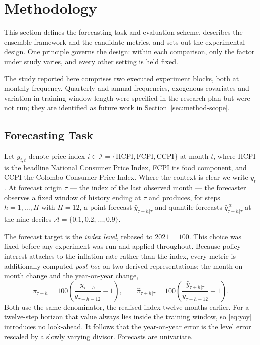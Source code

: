 \documentclass[12pt]{article}
\begin{document}
\section{Methodology}
\label{sec:methodology}

This section defines the forecasting task and evaluation scheme, describes the
ensemble framework and the candidate metrics, and sets out the experimental
design. One principle governs the design: within each comparison, only the
factor under study varies, and every other setting is held fixed.

The study reported here comprises two executed experiment blocks, both at
monthly frequency. Quarterly and annual frequencies, exogenous covariates and
variation in training-window length were specified in the research plan but
were not run; they are identified as future work in
Section~\ref{sec:method-scope}.

\subsection{Forecasting Task}
\label{sec:method-task}

Let $y_{i,t}$ denote price index
$i \in \mathcal{I} = \{\text{HCPI}, \text{FCPI}, \text{CCPI}\}$ at month $t$,
where HCPI is the headline National Consumer Price Index, FCPI its food
component, and CCPI the Colombo Consumer Price Index. Where the context is
clear we write $y_t$. At forecast origin $\tau$ --- the index of the last observed
month --- the forecaster observes a fixed window of history ending at $\tau$ and
produces, for steps
$h = 1, \dots, H$ with $H = 12$, a point forecast $\hat{y}_{\tau+h|\tau}$ and
quantile forecasts $\hat{q}^{\,\alpha}_{\tau+h|\tau}$ at the nine deciles
$\mathcal{A} = \{0.1, 0.2, \dots, 0.9\}$.

The forecast target is the \emph{index level}, rebased to $2021 = 100$. This
choice was fixed before any experiment was run and applied throughout. Because
policy interest attaches to the inflation rate rather than the index, every
metric is additionally computed \emph{post hoc} on two derived
representations: the month-on-month change and the year-on-year change,
\begin{equation}
    \pi_{\tau+h} = 100\left(\frac{y_{\tau+h}}{y_{\tau+h-12}} - 1\right),
    \qquad
    \hat{\pi}_{\tau+h|\tau}
        = 100\left(\frac{\hat{y}_{\tau+h|\tau}}{y_{\tau+h-12}} - 1\right).
    \label{eq:yoy}
\end{equation}
Both use the same denominator, the realised index twelve months earlier. For a
twelve-step horizon that value always lies inside the training window, so
\eqref{eq:yoy} introduces no look-ahead. It follows that the year-on-year error
is the level error rescaled by a slowly varying divisor. Forecasts are
univariate.
\end{document}
